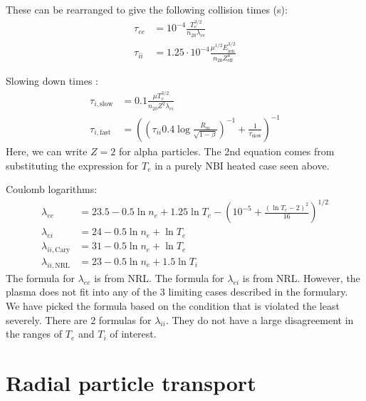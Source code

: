 These can be rearranged to give the following collision times (s):    
\begin{align}
    \tau_{ee} &= 10^{-4} \frac{T_e^{3/2}}{n_{20} \lambda_{ee}} \\
    \tau_{ii} &= 1.25\cdot10^{-4} \frac{\mu^{1/2} E_{\text{ion}}^{3/2}}{n_{20}Z_{\text{eff}}^4}
\end{align}

Slowing down times \cite{dolan_1982} :
\begin{align}
    \tau_{i,\text{slow}} &= 0.1 \frac{\mu T_e^{3/2}}{n_{20} Z^2 \lambda_{ei}} \\
    \tau_{i,\text{fast}} &= \left( \left( \tau_{ii} 0.4 \log{\frac{R_m}{\sqrt{1-\beta}}} \right)^{-1} + \frac{1}{\tau_{\text{slow}}} \right)^{-1}
\end{align}
Here, we can write $Z=2$ for alpha particles. The 2nd equation comes from substituting the expression for $T_e$ in a purely NBI heated case seen above.

Coulomb logarithms:
\begin{align}
    \lambda_{ee} &= 23.5 - 0.5\ln{n_e} + 1.25\ln{T_{e}} - \left( 10^{-5} + \frac{\left( \ln{T_{e}} - 2 \right)^2}{16} \right)^{1/2} \\
    \lambda_{ei} &= 24 - 0.5\ln{n_e} + \ln{T_e} \\
    \lambda_{ii, \text{Cary}} &= 31 - 0.5 \ln{n_e} + \ln{T_e} \\
    \lambda_{ii, \text{NRL}} &= 23 - 0.5 \ln{n_e} + 1.5 \ln{T_i}
\end{align}
The formula for $\lambda_{ee}$ is from NRL. 
The formula for $\lambda_{ei}$ is from NRL. However, the plasma does not fit into any of the 3 limiting cases described in the formulary. We have picked the formula based on the condition that is violated the least severely. 
There are 2 formulas for $\lambda_{ii}$. They do not have a large disagreement in the ranges of $T_e$ and $T_i$ of interest.

\section{Radial particle transport}

